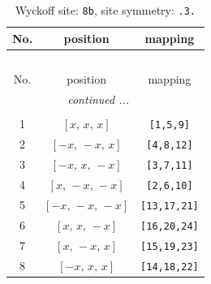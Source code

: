 \documentclass[fleqn,8pt]{jsarticle}
\begin{document}
\renewcommand{\arraystretch}{1.2}
\begin{longtable}{ccc}
\caption{Wyckoff site: {\tt 8b}, site symmetry: {\tt .3.}}
 \\
 \hline \hline
No. & position & mapping \\ \hline \endfirsthead

\multicolumn{2}{l}{\tablename\ \thetable{}} \\
 \hline \hline
No. & position & mapping \\ \hline \endhead

 \hline \hline
\multicolumn{2}{r}{\footnotesize\it continued ...} \\ \endfoot

 \hline \hline
\multicolumn{2}{r}{} \\ \endlastfoot

1 & $\left[ x,\, x,\, x \right]$ & {\tt [1,5,9]} \\ \hline
2 & $\left[ - x,\, - x,\, x \right]$ & {\tt [4,8,12]} \\ \hline
3 & $\left[ - x,\, x,\, - x \right]$ & {\tt [3,7,11]} \\ \hline
4 & $\left[ x,\, - x,\, - x \right]$ & {\tt [2,6,10]} \\ \hline
5 & $\left[ - x,\, - x,\, - x \right]$ & {\tt [13,17,21]} \\ \hline
6 & $\left[ x,\, x,\, - x \right]$ & {\tt [16,20,24]} \\ \hline
7 & $\left[ x,\, - x,\, x \right]$ & {\tt [15,19,23]} \\ \hline
8 & $\left[ - x,\, x,\, x \right]$ & {\tt [14,18,22]} \\
\end{longtable}
\renewcommand{\arraystretch}{1.2}
\end{document}

